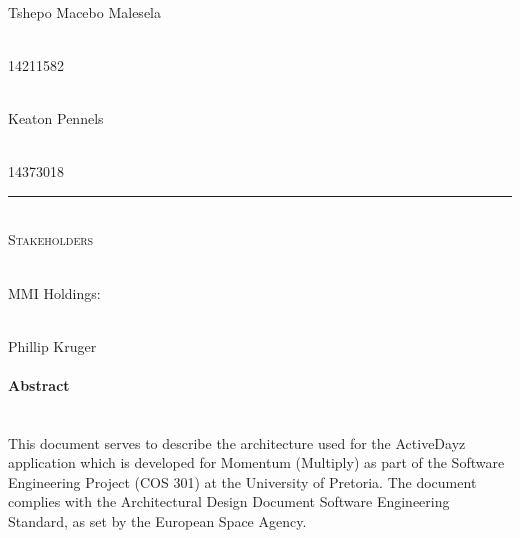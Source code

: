 \documentclass[11pt]{article}
\begin{document}
\begin{titlepage}
\begin{center}
		\begin{minipage}{0.4\textwidth}
			\begin{flushleft} \large
				\emph{} \\
				Tshepo Macebo {Malesela}
			\end{flushleft}
		\end{minipage}
		\begin{minipage}{0.4\textwidth}
			\begin{flushright} \large
				\emph{} \\
				14211582
			\end{flushright}
		\end{minipage}
        
        \begin{minipage}{0.4\textwidth}
			\begin{flushleft} \large
				\emph{} \\
				Keaton {Pennels}
			\end{flushleft}
		\end{minipage}
		\begin{minipage}{0.4\textwidth}
			\begin{flushright} \large
				\emph{} \\
				14373018
			\end{flushright}
		\end{minipage}
		
		\rule{\linewidth}{0.5mm} \\[1cm] 
		\textsc{\Large Stakeholders}\\[1cm]	
		
		\begin{minipage}{0.4\textwidth}
			\begin{flushleft} \large
				\emph{} \\
				MMI Holdings:
			\end{flushleft}
		\end{minipage}
		\begin{minipage}{0.4\textwidth}
			\begin{flushright} \large
				\emph{} \\
				Phillip Kruger
			\end{flushright}
		\end{minipage}

		
	\end{center}
\end{titlepage}

\newpage
\paragraph{Abstract}\mbox{}\\
This document serves to describe the architecture used for the ActiveDayz application which is developed for Momentum (Multiply) as part of the Software Engineering Project (COS 301) at the University of Pretoria.\newline
The document complies with the Architectural Design Document Software Engineering Standard, as set by the European Space Agency. 
\end{document}
